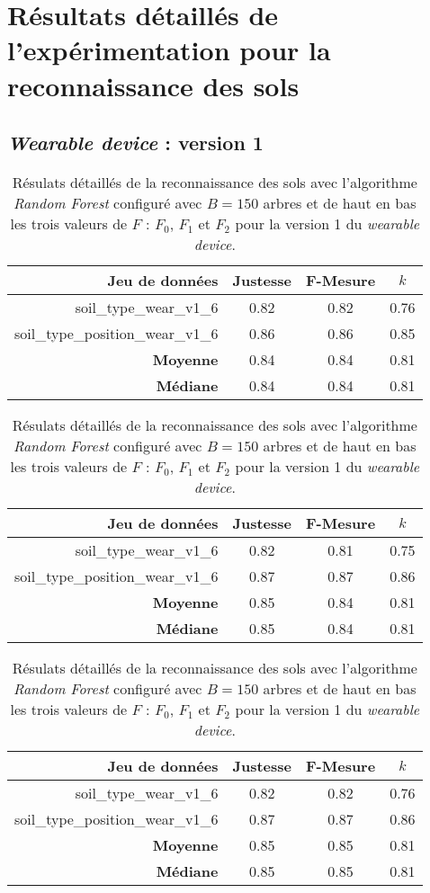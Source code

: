 \chapter{Résultats détaillés de l'expérimentation pour la reconnaissance des sols}
\label{anx:a}

\section{\textit{Wearable device} : version 1}

\begin{table}[H]\renewcommand{\arraystretch}{0.5}
	\centering
	\caption{Résulats détaillés de la reconnaissance des sols avec l'algorithme \textit{Random Forest} configuré avec $B=150$ arbres et de haut en bas les trois valeurs de $F$ : $F_0$, $F_1$ et $F_2$ pour la version 1 du \textit{wearable device}.}
	\label{tab:rf-150-wear-v1}
	\begin{tabular}{@{}rccc@{}}
		\toprule
			\textbf{Jeu de données} & \textbf{Justesse} & \textbf{F-Mesure} & \textbf{$k$} \\
		\midrule
			soil\_type\_wear\_v1\_6 & 0.82 & 0.82 & 0.76 \\
			soil\_type\_position\_wear\_v1\_6 & 0.86 & 0.86 & 0.85 \\
			\textbf{Moyenne} & 0.84 & 0.84 & 0.81 \\
			\textbf{Médiane} & 0.84 & 0.84 & 0.81 \\
	\end{tabular}
	\begin{tabular}{@{}rccc@{}}
		\toprule
			\textbf{Jeu de données} & \textbf{Justesse} & \textbf{F-Mesure} & \textbf{$k$} \\
		\midrule
			soil\_type\_wear\_v1\_6 & 0.82 & 0.81 & 0.75 \\
			soil\_type\_position\_wear\_v1\_6 & 0.87 & 0.87 & 0.86 \\
			\textbf{Moyenne} & 0.85 & 0.84 & 0.81 \\
			\textbf{Médiane} & 0.85 & 0.84 & 0.81 \\
	\end{tabular}
	\begin{tabular}{@{}rccc@{}}
		\toprule
			\textbf{Jeu de données} & \textbf{Justesse} & \textbf{F-Mesure} & \textbf{$k$} \\
		\midrule
			soil\_type\_wear\_v1\_6 & 0.82 & 0.82 & 0.76 \\
			soil\_type\_position\_wear\_v1\_6 & 0.87 & 0.87 & 0.86 \\
			\textbf{Moyenne} & 0.85 & 0.85 & 0.81 \\
			\textbf{Médiane} & 0.85 & 0.85 & 0.81 \\
		\bottomrule
	\end{tabular}
\end{table}

